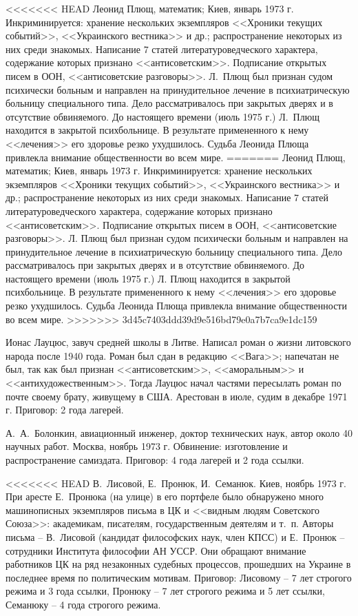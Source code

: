 \documentclass{book}
\begin{document}
<<<<<<< HEAD
Леонид Плющ, математик; Киев, январь 1973 г. Инкриминируется: хранение нескольких экземпляров <<Хроники текущих событий>>, <<Украинского вестника>> и др.; распространение некоторых из них среди знакомых. Написание 7 статей литературоведческого характера, содержание которых признано <<антисоветским>>. Подписание открытых писем в ООН, <<антисоветские разговоры>>. Л.~Плющ был признан судом психически больным и направлен на принудительное лечение в психиатрическую больницу специального типа. Дело рассматривалось при закрытых дверях и в отсутствие обвиняемого. До настоящего времени (июль 1975 г.) Л.~Плющ находится в закрытой психбольнице. В результате примененного к нему <<лечения>> его здоровье резко ухудшилось. Судьба Леонида Плюща привлекла внимание общественности во всем мире.
=======
Леонид Плющ, математик; Киев, январь 1973 г. Инкриминируется: хранение нескольких экземпляров <<Хроники текущих событий>>, <<Украинского вестника>> и др.; распространение некоторых из них среди знакомых. Написание 7 статей литературоведческого характера, содержание которых признано <<антисоветским>>. Подписание открытых писем в ООН, <<антисоветские разговоры>>. Л. Плющ был признан судом психически больным и направлен на принудительное лечение в психиатрическую больницу специального типа. Дело рассматривалось при закрытых дверях и в отсутствие обвиняемого. До настоящего времени (июль 1975 г.) Л. Плющ находится в закрытой психбольнице. В результате примененного к нему <<лечения>> его здоровье резко ухудшилось. Судьба Леонида Плюща привлекла внимание общественности во всем мире.
>>>>>>> 3d45c7403ddd39d9e516bd79e0a7b7ca9e1dc159

Ионас Лауцюс, завуч средней школы в Литве. Написал роман о жизни литовского народа после 1940 года. Роман был сдан в редакцию <<Вага>>; напечатан не был, так как был признан <<антисоветским>>, <<аморальным>> и <<антихудожественным>>. Тогда Лауцюс начал частями пересылать роман по почте своему брату, живущему в США. Арестован в июле, судим в декабре 1971 г. Приговор: 2 года лагерей.

А.~А.~Болонкин, авиационный инженер, доктор технических наук, автор около 40 научных работ. Москва, ноябрь 1973 г. Обвинение: изготовление и распространение самиздата. Приговор: 4 года лагерей и 2 года ссылки.

<<<<<<< HEAD
В.~Лисовой, Е.~Пронюк, И.~Семанюк. Киев, ноябрь 1973 г. При аресте Е.~Пронюка (на улице) в его портфеле было обнаружено много машинописных экземпляров письма в ЦК и <<видным людям Советского Союза>>: академикам, писателям, государственным деятелям и т.~п. Авторы письма -- В.~Лисовой (кандидат философских наук, член КПСС) и Е.~Пронюк -- сотрудники Института философии АН УССР. Они обращают внимание работников ЦК на ряд незаконных судебных про­цессов, прошедших на Украине в последнее время по политическим мотивам. Приговор: Лисовому -- 7 лет строгого режи­ма и 3 года ссылки, Пронюку -- 7 лет строгого режима и 5 лет ссылки, Семанюку -- 4 года строгого режима.
\end{document}
